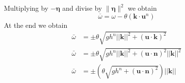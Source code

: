 \documentclass[a4paper, 11pt]{article}
\begin{document}
Multiplying by  $-\boldsymbol{\eta}$ and divise by  $\parallel\boldsymbol{\eta}\parallel^2$ we obtain
$$
\overline{\omega}=\omega -\theta(\boldsymbol{k}\cdot \boldsymbol{u}^n)
$$
At the end we obtain
\begin{align*}
\bar{\omega} &=\pm\theta\sqrt{gh^n||\boldsymbol{k}||^2+\left(\boldsymbol{u}\cdot \boldsymbol{k}\right)^2}\\
\bar{\omega} &=\pm\theta\sqrt{gh^n||\boldsymbol{k}||^2+\left(\boldsymbol{u}\cdot \boldsymbol{n}\right)^2||\boldsymbol{k}||^2}\\
\bar{\omega} &=\pm\left(\theta\sqrt{gh^n+\left(\boldsymbol{u}\cdot \boldsymbol{n}\right)^2}\right)||\boldsymbol{k}||\\
\end{align*}
\end{document}
